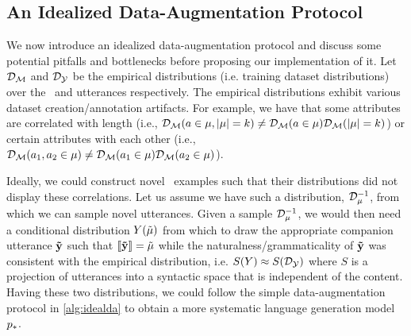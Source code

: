 \subsection{An Idealized Data-Augmentation Protocol}
\label{sec:ideal}

We now introduce an idealized data-augmentation protocol and discuss some
potential pitfalls and bottlenecks before proposing our implementation of it.
Let $\mathcal{D}_{\mathcal{M}}$ and $\mathcal{D}_{\mathcal{Y}}$ be the empirical distributions
(i.e. training dataset distributions) over the \meaningrepresentations~and
utterances respectively. The empirical distributions exhibit various dataset
creation/annotation artifacts. For example, we have that some attributes  are
correlated with length (i.e., $\mathcal{D}_{\mathcal{M}}(a \in \mu, {\left\vert \mu \right\vert} = k)
\ne \mathcal{D}_{\mathcal{M}}(a \in \mu)\mathcal{D}_{\mathcal{M}}({\left\vert \mu \right\vert} = k)$) or certain
attributes with each other (i.e., $\mathcal{D}_{\mathcal{M}}(a_1, a_2 \in \mu) \ne
\mathcal{D}_{\mathcal{M}}(a_1 \in \mu)\mathcal{D}_{\mathcal{M}}(a_2\in \mu)$).

Ideally, we could construct novel \meaningrepresentation~examples such that
their distributions did not display these correlations. Let us assume we have
such a distribution, $\mathcal{D}_{\mu}^{-1}$, from which we can sample novel
utterances.  Given a sample $\mathcal{D}_{\mu}^{-1}$, we would then need a
conditional distribution $Y(\tilde{\mu})$ from which to draw the
appropriate companion utterance $\boldsymbol{\tilde{\mathbf{y}}}$ such that $\left\llbracket \boldsymbol{\tilde{\mathbf{y}}} \right\rrbracket
= \tilde{\mu}$ while the naturalness/grammaticality of $\boldsymbol{\tilde{\mathbf{y}}}$ was
consistent with the empirical distribution, i.e. $S(Y) \approx
S(\mathcal{D}_{\mathcal{Y}})$ where $S$ is a projection of utterances into a syntactic
space that is independent of the content.  Having these two distributions, we
could follow the simple data-augmentation protocol in \autoref{alg:idealda} to
obtain a more systematic language generation model $p_*$.

